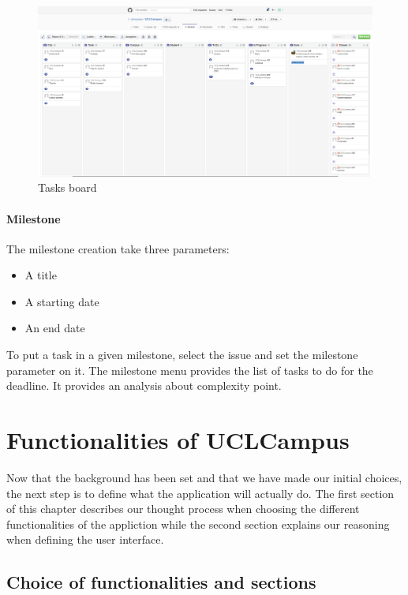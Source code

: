 \documentclass{eplmastersthesis}
\begin{document}
\begin{figure}[H]
\centering
\includegraphics[scale = 0.45, angle = 90]{Images/dashboard.png}
\caption{Tasks board}
\end{figure}

\subsubsection{Milestone}

The milestone creation take three parameters:
\begin{itemize}
\item A title
\item A starting date
\item An end date
\end{itemize} 
To put a task in a given milestone, select the issue and set the milestone parameter on it. The milestone menu provides the list of tasks to do for the deadline. It provides an analysis about complexity point.

\chapter{Functionalities of UCLCampus}

Now that the background has been set and that we have made our initial choices, the next step is to define what the application will actually do. The first section of this chapter describes our thought process when choosing the different functionalities of the appliction while the second section explains our reasoning when defining the user interface.

\section{Choice of functionalities and sections}
\end{document}
